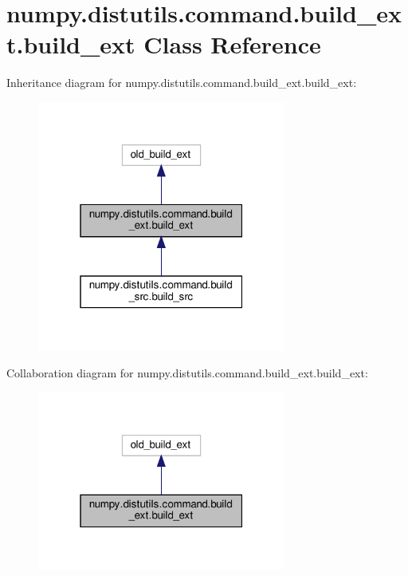 \hypertarget{classnumpy_1_1distutils_1_1command_1_1build__ext_1_1build__ext}{}\section{numpy.\+distutils.\+command.\+build\+\_\+ext.\+build\+\_\+ext Class Reference}
\label{classnumpy_1_1distutils_1_1command_1_1build__ext_1_1build__ext}


Inheritance diagram for numpy.\+distutils.\+command.\+build\+\_\+ext.\+build\+\_\+ext\+:
\nopagebreak
\begin{figure}[H]
\begin{center}
\leavevmode
\includegraphics[width=232pt]{classnumpy_1_1distutils_1_1command_1_1build__ext_1_1build__ext__inherit__graph}
\end{center}
\end{figure}


Collaboration diagram for numpy.\+distutils.\+command.\+build\+\_\+ext.\+build\+\_\+ext\+:
\nopagebreak
\begin{figure}[H]
\begin{center}
\leavevmode
\includegraphics[width=232pt]{classnumpy_1_1distutils_1_1command_1_1build__ext_1_1build__ext__coll__graph}
\end{center}
\end{figure}
